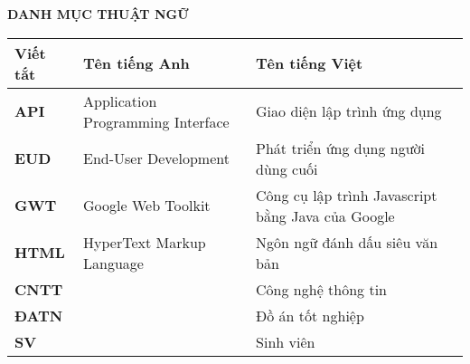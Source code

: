 \documentclass[../DoAn.tex]{subfiles}
\begin{document}
\begin{center}
    \Large{\textbf{DANH MỤC THUẬT NGỮ}}\\
\end{center}

\begin{longtable}{l p{6cm} p{7cm}}
	\hline
   \textbf{Viết tắt}  & \textbf{Tên tiếng Anh}	& \textbf{Tên tiếng Việt} \\ \hline 
	\textbf{API} & Application Programming Interface & Giao diện lập trình ứng dụng\\
	\textbf{EUD} & End-User Development & Phát triển ứng dụng người dùng cuối\\
	\textbf{GWT} & Google Web Toolkit & Công cụ lập trình Javascript bằng Java của Google\\
	\textbf{HTML} & HyperText Markup Language & Ngôn ngữ đánh dấu siêu văn bản\\
	\textbf{CNTT }  &   & Công nghệ thông tin\\
	\textbf{ĐATN} &  & Đồ án tốt nghiệp \\
	\textbf{SV} &  & Sinh viên \\

    \hline
\end{longtable}
\end{document}
